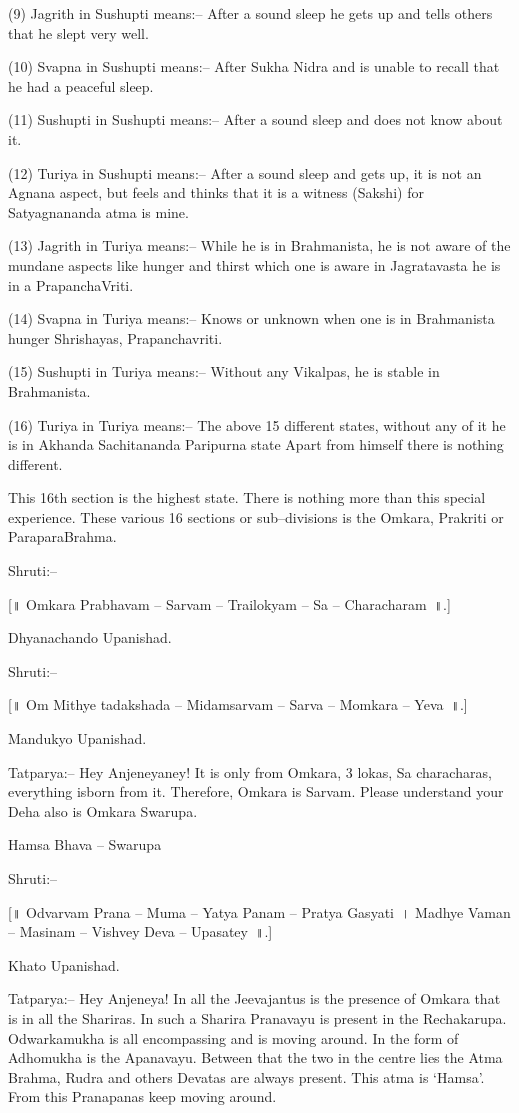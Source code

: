 (9) Jagrith in Sushupti means:– After a sound sleep he gets up and tells others that he slept very well.

(10) Svapna in Sushupti means:– After Sukha Nidra and is unable to recall that he had a peaceful sleep.

(11) Sushupti in Sushupti means:– After a sound sleep and does not know about it.

(12) Turiya in Sushupti means:– After a sound sleep and gets up, it is not an Agnana aspect, but feels and thinks that it is a witness (Sakshi) for Satyagnananda atma is mine.

(13) Jagrith in Turiya means:– While he is in Brahmanista, he is not aware of the mundane aspects like hunger and thirst which one is aware in Jagratavasta he is in a PrapanchaVriti.

(14) Svapna in Turiya means:– Knows or unknown when one is in Brahmanista hunger Shrishayas, Prapanchavriti.

(15) Sushupti in Turiya means:– Without any Vikalpas, he is stable in Brahmanista.

(16) Turiya in Turiya means:– The above 15 different states, without any of it he is in Akhanda Sachitananda Paripurna state Apart from himself there is nothing different.

This 16th section is the highest state. There is nothing more than this special experience. These various 16 sections or sub–divisions is the Omkara, Prakriti or ParaparaBrahma.

Shruti:–

[॥ Omkara Prabhavam – Sarvam – Trailokyam – Sa – Characharam~॥.]

Dhyanachando Upanishad.

Shruti:–

[॥ Om Mithye tadakshada – Midamsarvam – Sarva – Momkara – Yeva~॥.]

Mandukyo Upanishad.

Tatparya:– Hey Anjeneyaney! It is only from Omkara, 3 lokas, Sa characharas, everything isborn from it. Therefore, Omkara is Sarvam. Please understand your Deha also is Omkara Swarupa.

Hamsa Bhava – Swarupa

Shruti:–

[॥ Odvarvam Prana – Muma – Yatya Panam – Pratya Gasyati~। Madhye Vaman – Masinam – Vishvey Deva – Upasatey~॥.]

Khato Upanishad.

Tatparya:– Hey Anjeneya! In all the Jeevajantus is the presence of Omkara that is in all the Shariras. In such a Sharira Pranavayu is present in the Rechakarupa. Odwarkamukha is all encompassing and is moving around. In the form of Adhomukha is the Apanavayu. Between that the two in the centre lies the Atma Brahma, Rudra and others Devatas are always present. This atma is ‘Hamsa’. From this Pranapanas keep moving around.

